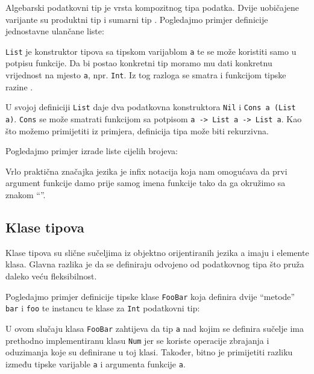 Algebarski podatkovni tip je vrsta kompozitnog tipa podatka. Dvije uobičajene varijante su produktni tip  i sumarni tip . Pogledajmo primjer definicije jednostavne ulančane liste:


\texttt{List} je konstruktor tipova  sa tipskom varijablom \texttt{a}  te se može koristiti samo u potpisu funkcije. Da bi postao konkretni tip moramo mu dati konkretnu vrijednost na mjesto \texttt{a}, npr. \texttt{Int}. Iz tog razloga se smatra i funkcijom tipske razine .

U svojoj definiciji \texttt{List} daje dva podatkovna konstruktora \texttt{Nil} i \texttt{Cons a (List a)}. \texttt{Cons} se može smatrati funkcijom sa potpisom \texttt{a -> List a -> List a}. Kao što možemo primijetiti iz primjera, definicija tipa može biti rekurzivna.

Pogledajmo primjer izrade liste cijelih brojeva:


Vrlo praktična značajka jezika je infix notacija koja nam omogućava da prvi argument funkcije damo prije samog imena funkcije tako da ga okružimo sa znakom ``\texttt{\textasciigrave}''.

\subsection{Klase tipova}

Klase tipova su slične sučeljima  iz objektno orijentiranih jezika a imaju i elemente klasa. Glavna razlika je da se definiraju odvojeno od podatkovnog tipa što pruža daleko veću fleksibilnost.

Pogledajmo primjer definicije tipske klase \texttt{FooBar} koja definira dvije ``metode'' \texttt{bar} i \texttt{foo} te instancu te klase za \texttt{Int} podatkovni tip:


U ovom slučaju klasa \texttt{FooBar} zahtijeva da tip \texttt{a} nad kojim se definira sučelje ima prethodno implementiranu klasu \texttt{Num} jer se koriste operacije zbrajanja i oduzimanja koje su definirane u toj klasi. Također, bitno je primijetiti razliku između tipske varijable \texttt{a} i argumenta funkcije \texttt{a}.

